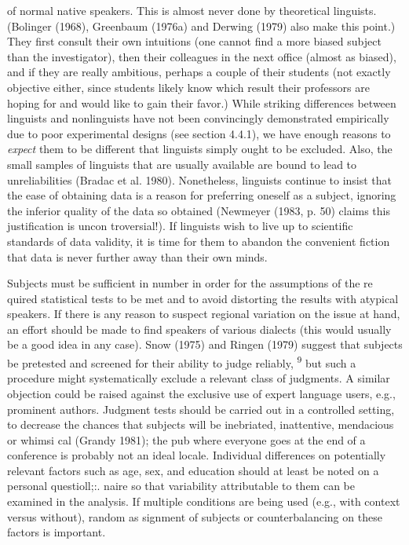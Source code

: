 \begin{styleTextbody}
of normal native speakers. This is almost never done by theoretical linguists. (Bolinger (1968), Greenbaum (1976a) and Derwing (1979) also make this point.) They first consult their own intuitions (one cannot find a more biased subject than the investigator), then their colleagues in the next office (almost as biased), and if they are really ambitious, perhaps a couple of their students (not exactly objective either, since students likely know which result their professors are hoping for and would like to gain their favor.) While striking differences between linguists and nonlinguists have not been convincingly demonstrated empirically due to poor experimental designs (see section 4.4.1), we have enough reasons to \textit{expect}\textit{ }them to be different that linguists simply ought to be excluded. Also, the small samples of linguists that are usually available are bound to lead to unreliabilities (Bradac et al. 1980). Nonetheless, linguists continue to insist that the ease of obtaining data is a reason for preferring oneself as a subject, ignoring the inferior quality of the data so obtained (Newmeyer (1983, p. 50) claims this justification is uncon\- troversial!). If linguists wish to live up to scientific standards of data validity, it is time for them to abandon the convenient fiction that data is never further away than their own minds.
\end{styleTextbody}


\begin{styleTextbody}
Subjects must be sufficient in number in order for the assumptions of the re\- quired statistical tests to be met and to avoid distorting the results with atypical speakers. If there is any reason to suspect regional variation on the issue at hand, an effort should be made to find speakers of various dialects (this would usually be a good idea in any case). Snow (1975) and Ringen (1979) suggest that subjects be pretested and screened for their ability to judge reliably, \textsuperscript{9}\textsuperscript{ }but such a procedure might systematically exclude a relevant class of judgments. A similar objection could be raised against the exclusive use of expert language users, e.g., prominent authors. Judgment tests should be carried out in a controlled setting, to decrease the chances that subjects will be {\textquotedbl}inebriated, inattentive, mendacious or whimsi\- cal{\textquotedbl} (Grandy 1981); the pub where everyone goes at the end of a conference is probably not an ideal locale. Individual differences on potentially relevant factors such as age, sex, and education should at least be noted on a personal questioll;:. naire so that variability attributable to them can be examined in the analysis. If multiple conditions are being used (e.g., with context versus without), random as\- signment of subjects or counterbalancing on these factors is important.
\end{styleTextbody}


